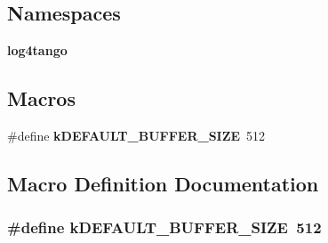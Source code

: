 \subsection*{Namespaces}
\begin{DoxyCompactItemize}
\item 
{\bf log4tango}
\end{DoxyCompactItemize}
\subsection*{Macros}
\begin{DoxyCompactItemize}
\item 
\#define {\bf k\-D\-E\-F\-A\-U\-L\-T\-\_\-\-B\-U\-F\-F\-E\-R\-\_\-\-S\-I\-Z\-E}~512
\end{DoxyCompactItemize}


\subsection{Macro Definition Documentation}
\subsubsection[{k\-D\-E\-F\-A\-U\-L\-T\-\_\-\-B\-U\-F\-F\-E\-R\-\_\-\-S\-I\-Z\-E}]{\setlength{\rightskip}{0pt plus 5cm}\#define k\-D\-E\-F\-A\-U\-L\-T\-\_\-\-B\-U\-F\-F\-E\-R\-\_\-\-S\-I\-Z\-E~512}\label{LogStreambuf_8hh_a17303732aa74827e074fb65d980902af}
